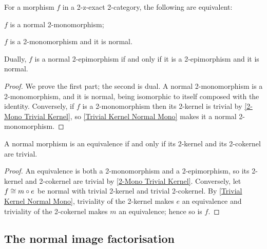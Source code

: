 \begin{corollary}
  \label{Normal Mono Criterion}   \leanok
  For a morphism \(f\) in a 2-z-exact 2-category, the following are equivalent:
	\begin{tfae}
		\item \(f\) is a normal 2-monomorphism;
		\item \(f\) is a 2-monomorphism and it is normal.
	\end{tfae}
	Dually, \(f\) is a normal 2-epimorphism if and only if it is a 2-epimorphism and it is normal.
\end{corollary}

\begin{proof}
  \leanok
  We prove the first part; the second is dual. A normal 2-monomorphism is a 2-monomorphism, and it is normal, being isomorphic to itself composed with the identity. Conversely, if \(f\) is a 2-monomorphism then its 2-kernel is trivial by \lemx\ref{2-Mono Trivial Kernel}, so \corx\ref{Trivial Kernel Normal Mono} makes it a normal 2-monomorphism.
\end{proof}

\begin{proposition}
  \label{Normal Equivalence Trivial}   \leanok
  A normal morphism is an equivalence if and only if its 2-kernel and its 2-cokernel are trivial.
\end{proposition}

\begin{proof}
  \leanok
  An equivalence is both a 2-monomorphism and a 2-epimorphism, so its 2-kernel and 2-cokernel are trivial by \lemx\ref{2-Mono Trivial Kernel}. Conversely, let \(f\cong m\circ e\) be normal with trivial 2-kernel and trivial 2-cokernel. By \corx\ref{Trivial Kernel Normal Mono}, triviality of the 2-kernel makes \(e\) an equivalence and triviality of the 2-cokernel makes \(m\) an equivalence; hence so is \(f\).
\end{proof}

\subsection{The normal image factorisation}\label{SS:ImageFactorisation}

